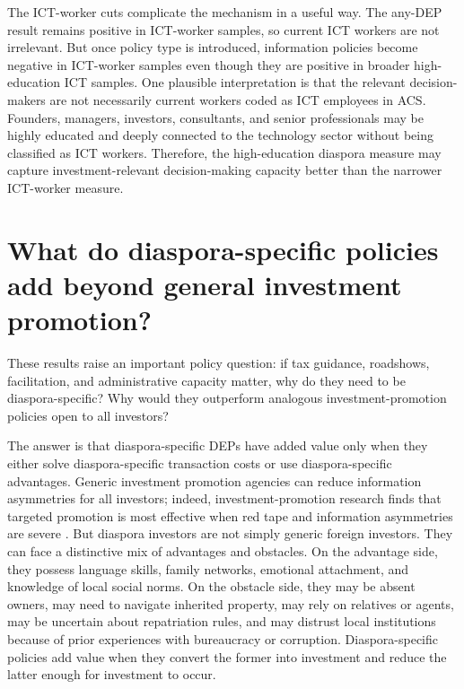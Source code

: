 \documentclass[doublespace,nopageskip]{UVAthesis}
\begin{document}
The ICT-worker cuts complicate the mechanism in a useful way. The any-DEP result remains positive in ICT-worker samples, so current ICT workers are not irrelevant. But once policy type is introduced, information policies become negative in ICT-worker samples even though they are positive in broader high-education ICT samples. One plausible interpretation is that the relevant decision-makers are not necessarily current workers coded as ICT employees in ACS. Founders, managers, investors, consultants, and senior professionals may be highly educated and deeply connected to the technology sector without being classified as ICT workers. Therefore, the high-education diaspora measure may capture investment-relevant decision-making capacity better than the narrower ICT-worker measure.

\section{What do diaspora-specific policies add beyond general investment promotion?}

These results raise an important policy question: if tax guidance, roadshows, facilitation, and administrative capacity matter, why do they need to be diaspora-specific? Why would they outperform analogous investment-promotion policies open to all investors?

The answer is that diaspora-specific DEPs have added value only when they either solve diaspora-specific transaction costs or use diaspora-specific advantages. Generic investment promotion agencies can reduce information asymmetries for all investors; indeed, investment-promotion research finds that targeted promotion is most effective when red tape and information asymmetries are severe \citep{harding_javorcik_roll_2011}. But diaspora investors are not simply generic foreign investors. They can face a distinctive mix of advantages and obstacles. On the advantage side, they possess language skills, family networks, emotional attachment, and knowledge of local social norms. On the obstacle side, they may be absent owners, may need to navigate inherited property, may rely on relatives or agents, may be uncertain about repatriation rules, and may distrust local institutions because of prior experiences with bureaucracy or corruption. Diaspora-specific policies add value when they convert the former into investment and reduce the latter enough for investment to occur.
\end{document}
